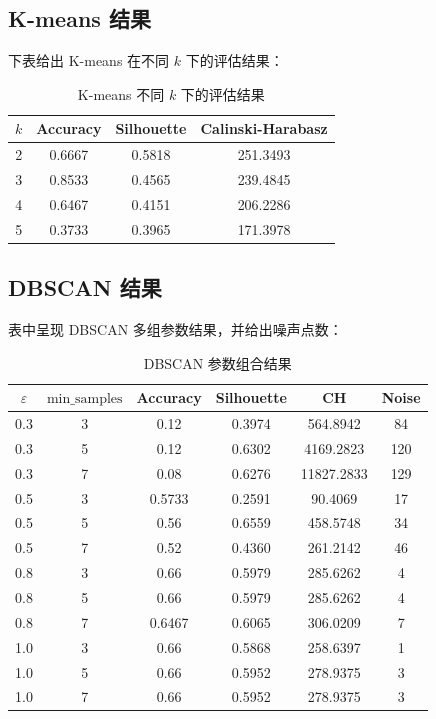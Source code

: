 \subsection{K-means 结果}
下表给出 K-means 在不同 $k$ 下的评估结果：
\begin{table}[htbp]
    \centering
    \caption{K-means 不同 $k$ 下的评估结果}
    \label{tab:kmeans_results}
    \begin{tabular}{|c|c|c|c|}
        \hline
        $k$ & Accuracy & Silhouette & Calinski-Harabasz \\
        \hline
        2 & 0.6667 & 0.5818 & 251.3493 \\
        3 & 0.8533 & 0.4565 & 239.4845 \\
        4 & 0.6467 & 0.4151 & 206.2286 \\
        5 & 0.3733 & 0.3965 & 171.3978 \\
        \hline
    \end{tabular}
\end{table}

\subsection{DBSCAN 结果}

表中呈现 DBSCAN 多组参数结果，并给出噪声点数：
\begin{table}[htbp]
    \centering
    \caption{DBSCAN 参数组合结果}
    \label{tab:dbscan_results}
    \begin{tabular}{|c|c|c|c|c|c|}
        \hline
        $\varepsilon$ & $\mathrm{min\_samples}$ & Accuracy & Silhouette & CH & Noise \\
        \hline
        0.3 & 3 & 0.12 & 0.3974 & 564.8942 & 84 \\
        0.3 & 5 & 0.12 & 0.6302 & 4169.2823 & 120 \\
        0.3 & 7 & 0.08 & 0.6276 & 11827.2833 & 129 \\
        0.5 & 3 & 0.5733 & 0.2591 & 90.4069 & 17 \\
        0.5 & 5 & 0.56 & 0.6559 & 458.5748 & 34 \\
        0.5 & 7 & 0.52 & 0.4360 & 261.2142 & 46 \\
        0.8 & 3 & 0.66 & 0.5979 & 285.6262 & 4 \\
        0.8 & 5 & 0.66 & 0.5979 & 285.6262 & 4 \\
        0.8 & 7 & 0.6467 & 0.6065 & 306.0209 & 7 \\
        1.0 & 3 & 0.66 & 0.5868 & 258.6397 & 1 \\
        1.0 & 5 & 0.66 & 0.5952 & 278.9375 & 3 \\
        1.0 & 7 & 0.66 & 0.5952 & 278.9375 & 3 \\
        \hline
    \end{tabular}
\end{table}

